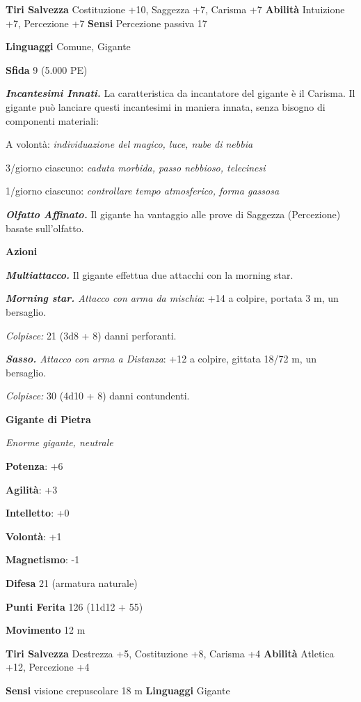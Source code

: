 \begin{multicols}{2}
\textbf{Tiri Salvezza} Costituzione +10, Saggezza +7, Carisma +7
\textbf{Abilità} Intuizione +7, Percezione +7 \textbf{Sensi} Percezione
passiva 17

\textbf{Linguaggi} Comune, Gigante

\textbf{Sfida} 9 (5.000 PE)

\emph{\textbf{Incantesimi Innati.}} La caratteristica da incantatore del
gigante è il Carisma. Il gigante può lanciare questi incantesimi in
maniera innata, senza bisogno di componenti materiali:

A volontà: \emph{individuazione del magico, luce, nube di nebbia}

3/giorno ciascuno: \emph{caduta morbida, passo nebbioso, telecinesi}

1/giorno ciascuno: \emph{controllare tempo atmosferico, forma gassosa}

\emph{\textbf{Olfatto Affinato.}} Il gigante ha vantaggio alle prove di
Saggezza (Percezione) basate sull'olfatto.

\textbf{Azioni}

\emph{\textbf{Multiattacco.}} Il gigante effettua due attacchi con la
morning star.

\emph{\textbf{Morning star.} Attacco con arma da mischia}: +14 a
colpire, portata 3 m, un bersaglio.

\emph{Colpisce:} 21 (3d8 + 8) danni perforanti.

\emph{\textbf{Sasso.} Attacco con arma a Distanza}: +12 a colpire,
gittata 18/72 m, un bersaglio.

\emph{Colpisce:} 30 (4d10 + 8) danni contundenti.

\textbf{Gigante di Pietra}

\emph{Enorme gigante, neutrale}

\textbf{Potenza}: +6

\textbf{Agilità}: +3

\textbf{Intelletto}: +0

\textbf{Volontà}: +1

\textbf{Magnetismo}: -1

\textbf{Difesa} 21 (armatura naturale)

\textbf{Punti Ferita} 126 (11d12 + 55)

\textbf{Movimento} 12 m

\textbf{Tiri Salvezza} Destrezza +5, Costituzione +8, Carisma +4
\textbf{Abilità} Atletica +12, Percezione +4

\textbf{Sensi} visione crepuscolare 18 m
\textbf{Linguaggi} Gigante


\end{multicols}
